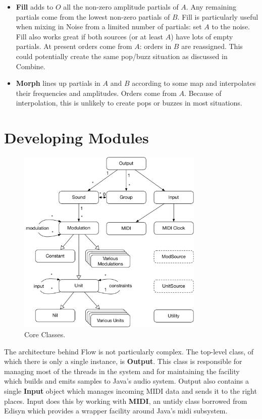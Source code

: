\documentclass{article}
\newcommand\bump{\vspace{20in}}
\newcommand\name{Flow}
\begin{document}
\begin{itemize}
\item {\bf Fill} adds to \(O\) all the non-zero amplitude partials of \(A\).  Any remaining partials come from the lowest non-zero partials of \(B\).  Fill is particularly useful when mixing in Noise from a limited number of partials: set \(A\) to the noise.  Fill also works great if both sources (or at least \(A\)) have lots of empty partials.  At present orders come from \(A\): orders in \(B\) are reassigned.  This could potentially create the same pop/buzz situation as discussed in Combine.

\item {\bf Morph} lines up partials in \(A\) and \(B\) according to some map and interpolates their frequencies and amplitudes.  Orders come from \(A\).  Because of interpolation, this is unlikely to create pops or buzzes in most situations.  



\end{itemize}

\bump
\section{Developing Modules}

\begin{figure}
\vspace{-1em}\includegraphics[width=3.5in]{CoreUML.pdf}
\vspace{-1em}
\caption{Core Classes.}
\vspace{-1em}
\end{figure}

The architecture behind {\name} is not particularly complex.  The top-level class, of which there is only a single instance, is {\bf Output}. This class is responsible for managing most of the threads in the system and for maintaining the facility which builds and emits samples to Java's audio system.  Output also contains a single {\bf Input} object which manages incoming MIDI data and sends it to the right places.  Input does this by working with {\bf MIDI}, an untidy class borrowed from Edisyn which provides a wrapper facility around Java's midi subsystem.
\end{document}
